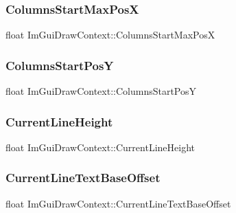 \subsubsection{\texorpdfstring{Columns\+Start\+Max\+PosX}{ColumnsStartMaxPosX}}
{\footnotesize\ttfamily float Im\+Gui\+Draw\+Context\+::\+Columns\+Start\+Max\+PosX}

\hypertarget{struct_im_gui_draw_context_adc5c108aa693534f656018ca095dd2ee}{}\label{struct_im_gui_draw_context_adc5c108aa693534f656018ca095dd2ee} 
\subsubsection{\texorpdfstring{Columns\+Start\+PosY}{ColumnsStartPosY}}
{\footnotesize\ttfamily float Im\+Gui\+Draw\+Context\+::\+Columns\+Start\+PosY}

\hypertarget{struct_im_gui_draw_context_a950b71358ebfed5a884936f5cafed873}{}\label{struct_im_gui_draw_context_a950b71358ebfed5a884936f5cafed873} 
\subsubsection{\texorpdfstring{Current\+Line\+Height}{CurrentLineHeight}}
{\footnotesize\ttfamily float Im\+Gui\+Draw\+Context\+::\+Current\+Line\+Height}

\hypertarget{struct_im_gui_draw_context_af6f0a3536765c5f638fd198749bf29f1}{}\label{struct_im_gui_draw_context_af6f0a3536765c5f638fd198749bf29f1} 
\subsubsection{\texorpdfstring{Current\+Line\+Text\+Base\+Offset}{CurrentLineTextBaseOffset}}
{\footnotesize\ttfamily float Im\+Gui\+Draw\+Context\+::\+Current\+Line\+Text\+Base\+Offset}

\hypertarget{struct_im_gui_draw_context_add16f0294ab2fd07b354da2bb99e43e1}{}\label{struct_im_gui_draw_context_add16f0294ab2fd07b354da2bb99e43e1} 
